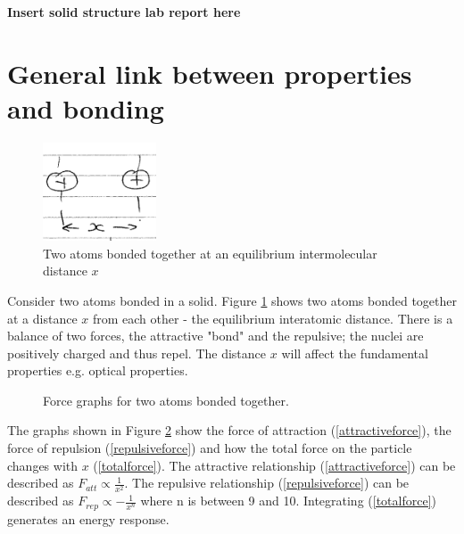 \documentclass[class=report, crop=false, 12pt,a4paper]{standalone}
\begin{document}
\textbf{Insert solid structure lab report here}
\section{General link between properties and bonding}
\begin{figure}[h]
  \centering
  \includegraphics[width=0.3\textwidth]{../img/2atomsbonded}\caption{Two atoms bonded together at an equilibrium intermolecular distance $x$}
  \label{2atomsbonded}
\end{figure}
Consider two atoms bonded in a solid. Figure \ref{2atomsbonded} shows two atoms bonded together at a distance $x$ from each other - the equilibrium interatomic distance. There is a balance of two forces, the attractive "bond" and the repulsive; the nuclei are positively charged and thus repel. The distance $x$ will affect the fundamental properties e.g. optical properties.
\begin{figure}[h]
  \centering
  \hfill
  \hfill
  \caption{Force graphs for two atoms bonded together.}
  \label{forcegraphs}
\end{figure}
The graphs shown in Figure \ref{forcegraphs} show the force of attraction (\ref{attractiveforce}), the force of repulsion (\ref{repulsiveforce}) and how the total force on the particle changes with $x$ (\ref{totalforce}). The attractive relationship (\ref{attractiveforce}) can be described as $F_{att} \propto \frac{1}{x^2}$. The repulsive relationship (\ref{repulsiveforce}) can be described as $F_{rep} \propto -\frac{1}{x^n}$ where n is between 9 and 10. Integrating (\ref{totalforce}) generates an energy response.
\end{document}
